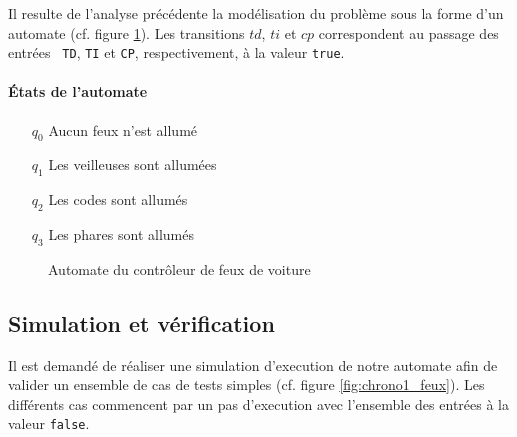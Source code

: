 \documentclass{article}
\begin{document}
      Il resulte de l'analyse précédente la modélisation du problème sous la
      forme d'un automate (cf. figure \ref{fig:autom_feux}). Les transitions
      $td$, $ti$ et $cp$ correspondent au passage des entrées {\tt
        TD}, {\tt TI} et {\tt CP}, respectivement, à la valeur {\tt true}.

      \paragraph{États de l'automate}
        \begin{itemize}
          \item[$q_0$] Aucun feux n'est allumé
          \item[$q_1$] Les veilleuses sont allumées
          \item[$q_2$] Les codes sont allumés
          \item[$q_3$] Les phares sont allumés
        \end{itemize}

      \begin{figure}
        \centering
        \caption{Automate du contrôleur de feux de voiture}
        \label{fig:autom_feux}
      \end{figure}

    \subsection{Simulation et vérification}

      Il est demandé de réaliser une simulation d'execution de notre automate
      afin de valider un ensemble de cas de tests simples (cf. figure
      \ref{fig:chrono1_feux}). Les différents cas commencent par un pas
      d'execution avec l'ensemble des entrées à la valeur {\tt false}.
\end{document}
